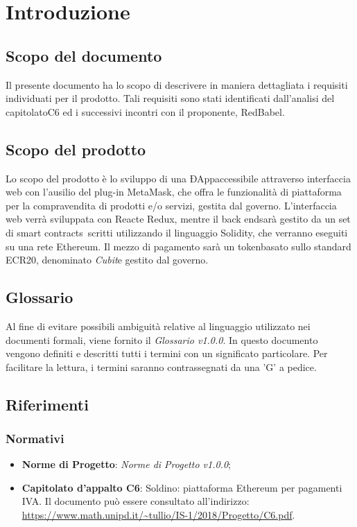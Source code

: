 \section{Introduzione} 
\subsection{Scopo del documento}
Il presente documento ha lo scopo di descrivere in maniera dettagliata i requisiti individuati per il prodotto. Tali requisiti sono stati identificati dall'analisi del capitolato\glosp C6 ed i successivi incontri con il proponente, RedBabel.
\subsection{Scopo del prodotto}
Lo scopo del prodotto è lo sviluppo di una ÐApp\glosp accessibile attraverso interfaccia web con l'ausilio del plug-in MetaMask\glo, che offra le funzionalità di piattaforma per la compravendita di prodotti e/o servizi, gestita dal governo\glo. L'interfaccia web verrà sviluppata con React\glosp e Redux\glo, mentre il back end\glosp sarà gestito da un set di smart contracts\ scritti utilizzando il linguaggio Solidity\glo, che verranno eseguiti su una rete Ethereum\glo.  Il mezzo di pagamento sarà un token\glosp basato sullo standard ECR20\glo, denominato \textit{Cubit}\glosp e gestito dal governo\glo.

\subsection{Glossario}
Al fine di evitare possibili ambiguità relative al linguaggio utilizzato nei documenti formali, viene fornito il \textit{Glossario v1.0.0}. In questo documento vengono definiti e descritti tutti i termini con un significato particolare. Per facilitare la lettura, i termini saranno contrassegnati da una 'G' a pedice.
\subsection{Riferimenti}
\subsubsection{Normativi}
\begin{itemize}
	\item \textbf{Norme di Progetto}: \textit{Norme di Progetto v1.0.0};
	\item \textbf{Capitolato d'appalto C6}: Soldino: piattaforma Ethereum per pagamenti IVA. Il documento può essere consultato all'indirizzo: \textsf{\url{ https://www.math.unipd.it/~tullio/IS-1/2018/Progetto/C6.pdf}}.
\end{itemize}
